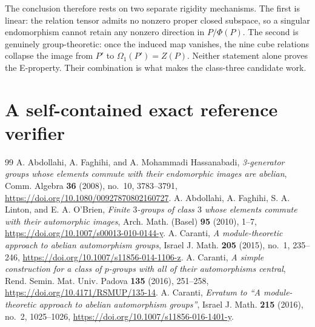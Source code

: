 \documentclass[10pt,a4paper]{amsart}
\begin{document}
The conclusion therefore rests on two separate rigidity mechanisms.  The
first is linear: the relation tensor admits no nonzero proper closed
subspace, so a singular endomorphism cannot retain any nonzero direction
in $P/\Phi(P)$.  The second is genuinely group-theoretic: once the induced
map vanishes, the nine cube relations collapse the image from $P'$ to
$\Omega_1(P')=Z(P)$.  Neither statement alone proves the E-property.  Their
combination is what makes the class-three candidate work.

\appendix
\section{A self-contained exact reference verifier}\label{app:verifier}


\begin{thebibliography}{99}
 A. Abdollahi, A. Faghihi, and A. Mohammadi Hassanabadi, \emph{3-generator groups whose elements commute with their endomorphic images are abelian}, Comm. Algebra \textbf{36} (2008), no.~10, 3783--3791, \url{https://doi.org/10.1080/00927870802160727}.
 A. Abdollahi, A. Faghihi, S. A. Linton, and E. A. O'Brien, \emph{Finite $3$-groups of class $3$ whose elements commute with their automorphic images}, Arch. Math. (Basel) \textbf{95} (2010), 1--7, \url{https://doi.org/10.1007/s00013-010-0144-y}.
 A. Caranti, \emph{A module-theoretic approach to abelian automorphism groups}, Israel J. Math. \textbf{205} (2015), no.~1, 235--246, \url{https://doi.org/10.1007/s11856-014-1106-z}.
 A. Caranti, \emph{A simple construction for a class of $p$-groups with all of their automorphisms central}, Rend. Semin. Mat. Univ. Padova \textbf{135} (2016), 251--258, \url{https://doi.org/10.4171/RSMUP/135-14}.
 A. Caranti, \emph{Erratum to ``A module-theoretic approach to abelian automorphism groups''}, Israel J. Math. \textbf{215} (2016), no.~2, 1025--1026, \url{https://doi.org/10.1007/s11856-016-1401-y}.
\end{thebibliography}
\end{document}
